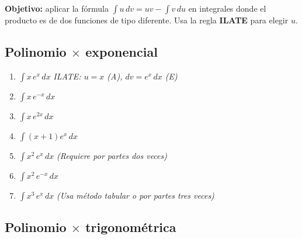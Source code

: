 \documentclass[12pt, letterpaper]{article}
\newcommand{\dx}{\,dx}
\newcommand{\du}{\,du}
\newcommand{\dv}{\,dv}
\begin{document}
\begin{cuadroinfo}
\small\textbf{Objetivo:} aplicar la fórmula $\int u\dv = uv - \int v\du$ en integrales
donde el producto es de dos funciones de tipo diferente. Usa la regla
\textbf{ILATE} para elegir $u$.
\end{cuadroinfo}

\vspace{4pt}

\subsection{Polinomio $\times$ exponencial}

\begin{enumerate}[label=\textbf{\arabic*.}, leftmargin=*, itemsep=12pt, start=47]

  \item \facil\quad
    $\displaystyle\int x\,e^x\dx$
    \qquad\textit{ILATE: $u = x$ (A), $dv = e^x\dx$ (E)}

  \item \facil\quad
    $\displaystyle\int x\,e^{-x}\dx$

  \item \medio\quad
    $\displaystyle\int x\,e^{2x}\dx$

  \item \medio\quad
    $\displaystyle\int (x+1)e^x\dx$

  \item \medio\quad
    $\displaystyle\int x^2\,e^x\dx$
    \qquad\textit{(Requiere por partes dos veces)}

  \item \dificil\quad
    $\displaystyle\int x^2\,e^{-x}\dx$

  \item \dificil\quad
    $\displaystyle\int x^3\,e^x\dx$
    \qquad\textit{(Usa método tabular o por partes tres veces)}

\end{enumerate}

\subsection{Polinomio $\times$ trigonométrica}
\end{document}
